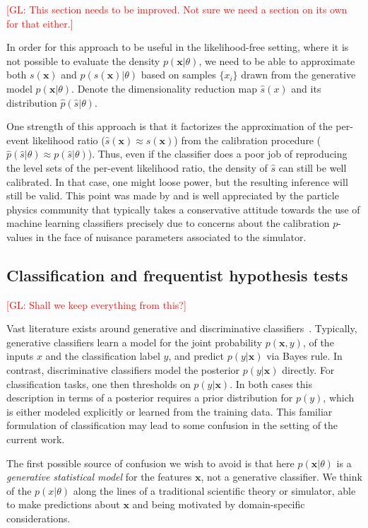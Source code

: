 \documentclass[12pt]{article}
\numberwithin{equation}{section}
\theoremstyle{plain}
\newcommand{\glnote}[1]{\textcolor{red}{[GL: #1]}}
\begin{document}
\glnote{This section needs to be improved. Not sure we need a section on its own for that either.}

In order for this approach to be useful in the likelihood-free setting, where it
is not possible to evaluate the density $p(\mathbf{x}|\theta)$, we need to be
able to approximate both $s(\mathbf{x})$ and
$p(s(\mathbf{x})|\theta)$ based on samples $\{x_i\}$ drawn from the generative
model $p(\mathbf{x}|\theta)$.  Denote the dimensionality reduction map
$\hat{s}(x)$ and its distribution $\hat{p}(\hat{s}|\theta)$.

One strength of this approach is that it factorizes the approximation of the
per-event likelihood ratio ($\hat{s}(\mathbf{x}) \approx
s(\mathbf{x})$) from the calibration procedure ($\hat p(\hat
s| \theta) \approx p(\hat{s}|\theta)$). Thus, even if the classifier does a poor
job of reproducing the level sets of the per-event likelihood ratio, the density
of $\hat{s}$ can still be well calibrated. In that case, one might loose power,
but the resulting inference will still be valid. This point was made by
\cite{Neal:2007zz} and is well appreciated by the particle physics community
that typically takes a conservative attitude towards the use of machine learning
classifiers precisely due to concerns about the calibration $p$-values in the
face of nuisance parameters associated to the simulator.

\subsection{Classification and frequentist hypothesis tests}

\glnote{Shall we keep everything from this?}

Vast literature exists around generative and discriminative
classifiers~\citep{AndrewY.Ng}. Typically, generative classifiers learn a model
for the joint probability $p(\mathbf{x}, y)$, of the inputs $x$ and the classification
label $y$, and predict $p(y|\mathbf{x})$ via Bayes rule. In contrast, discriminative
classifiers model the posterior $p(y|\mathbf{x})$ directly. For classification tasks, one
then thresholds on $p(y|\mathbf{x})$. In both cases this description in terms of a
posterior requires a prior distribution for $p(y)$, which is either modeled
explicitly or learned from the training data. This familiar formulation of
classification may lead to some confusion in the setting of the current work.

The first possible source of confusion we wish to avoid is that here
$p(\mathbf{x}|\theta)$  is a  \textit{generative statistical model} for the features $\mathbf{x}$,
not a generative classifier. We think of the  $p(x|\theta)$ along the lines of a
traditional scientific theory or simulator, able to make predictions about $\mathbf{x}$
and being motivated by domain-specific considerations.
\end{document}

